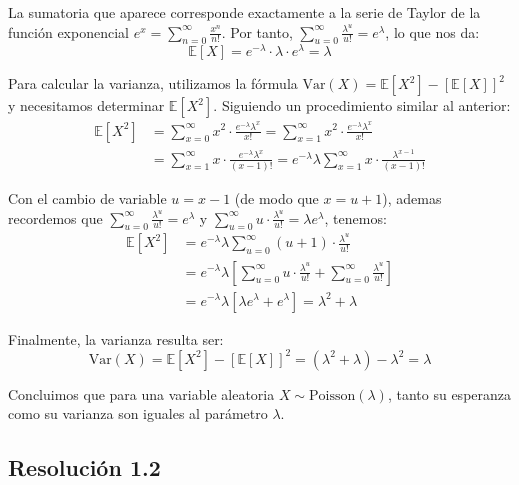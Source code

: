 \documentclass[
  11pt,
  letterpaper,
   addpoints,
  answers
  ]{exam}
\begin{document}
\begin{questions}
\begin{solution}
  La sumatoria que aparece corresponde exactamente a la serie de Taylor de la función exponencial $e^x = \sum_{n=0}^{\infty} \frac{x^n}{n!}$. Por tanto, $\sum_{u=0}^{\infty} \frac{\lambda^u}{u!} = e^{\lambda}$, lo que nos da:
  \begin{equation}
  \mathbb{E}[X] = e^{-\lambda} \cdot \lambda \cdot e^{\lambda} = \lambda
  \end{equation}
  
  Para calcular la varianza, utilizamos la fórmula $\text{Var}(X) = \mathbb{E}[X^2] - [\mathbb{E}[X]]^2$ y necesitamos determinar $\mathbb{E}[X^2]$. Siguiendo un procedimiento similar al anterior:
  \begin{align}
  \mathbb{E}[X^2] &= \sum_{x=0}^{\infty} x^2 \cdot \frac{e^{-\lambda} \lambda^x}{x!} = \sum_{x=1}^{\infty} x^2 \cdot \frac{e^{-\lambda} \lambda^x}{x!}\\
  &= \sum_{x=1}^{\infty} x \cdot \frac{e^{-\lambda} \lambda^x}{(x-1)!} = e^{-\lambda} \lambda \sum_{x=1}^{\infty} x \cdot \frac{\lambda^{x-1}}{(x-1)!}
  \end{align}
  
  Con el cambio de variable $u = x - 1$ (de modo que $x = u + 1$), ademas recordemos que $\sum_{u=0}^{\infty} \frac{\lambda^u}{u!} = e^{\lambda}$ y $\sum_{u=0}^{\infty} u \cdot \frac{\lambda^u}{u!} = \lambda e^{\lambda}$, tenemos:
  \begin{align}
  \mathbb{E}[X^2] &= e^{-\lambda} \lambda \sum_{u=0}^{\infty} (u+1) \cdot \frac{\lambda^u}{u!}\\
  &= e^{-\lambda} \lambda \left[ \sum_{u=0}^{\infty} u \cdot \frac{\lambda^u}{u!} + \sum_{u=0}^{\infty} \frac{\lambda^u}{u!} \right]\\
  &= e^{-\lambda} \lambda \left[ \lambda e^{\lambda} + e^{\lambda} \right] = \lambda^2 + \lambda
  \end{align}
  
  Finalmente, la varianza resulta ser:
  \begin{equation}
  \text{Var}(X) = \mathbb{E}[X^2] - [\mathbb{E}[X]]^2 = (\lambda^2 + \lambda) - \lambda^2 = \lambda
  \end{equation}
  
  Concluimos que para una variable aleatoria $X \sim \text{Poisson}(\lambda)$, tanto su esperanza como su varianza son iguales al parámetro $\lambda$.

  \subsection*{Resolución 1.2}
  

\end{solution}
\end{questions}
\end{document}
